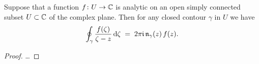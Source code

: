 \begin{theorem}
  \label{thm:CAUCHY_FORMULA}
  Suppose that a function $f \colon U \to \mathbb{C}$ is analytic on an open
  simply connected subset $U \subset \mathbb{C}$ of the complex plane.
  Then for any closed contour $\gamma$ %
  in $U$ we have
  \begin{align*}
    \oint_\gamma \frac{f(\zeta)}{\zeta - z} \, \mathrm{d} \zeta
    \; = \; 2\pi \mathfrak{i} \, \mathfrak{n}_{{\gamma}}(z) \, f(z) .
  \end{align*}
\end{theorem}
\begin{proof}
  \ldots
\end{proof}
